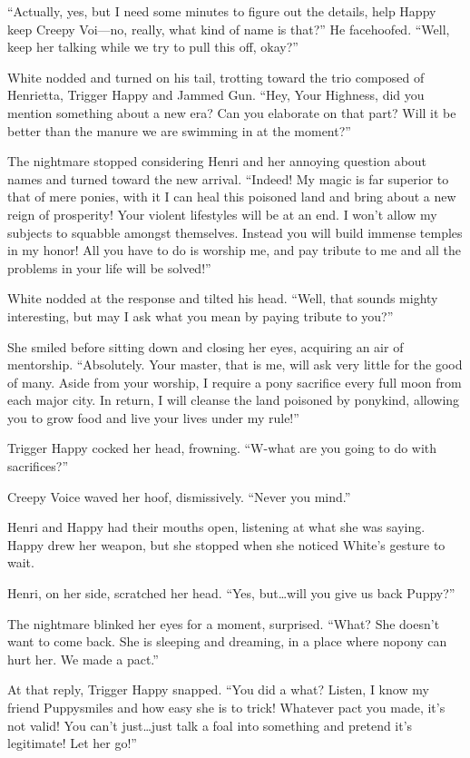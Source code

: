 ``Actually, yes, but I need some minutes to figure out the details, help Happy keep Creepy Voi---no, really, what kind of name is that?'' He facehoofed. ``Well, keep her talking while we try to pull this off, okay?''

White nodded and turned on his tail, trotting toward the trio composed of Henrietta, Trigger Happy and Jammed Gun. ``Hey, Your Highness, did you mention something about a new era? Can you elaborate on that part? Will it be better than the manure we are swimming in at the moment?''

The nightmare stopped considering Henri and her annoying question about names and turned toward the new arrival. ``Indeed! My magic is far superior to that of mere ponies, with it I can heal this poisoned land and bring about a new reign of prosperity! Your violent lifestyles will be at an end. I won't allow my subjects to squabble amongst themselves. Instead you will build immense temples in my honor! All you have to do is worship me, and pay tribute to me and all the problems in your life will be solved!''

White nodded at the response and tilted his head. ``Well, that sounds mighty interesting, but may I ask what you mean by paying tribute to you?''

She smiled before sitting down and closing her eyes, acquiring an air of mentorship. ``Absolutely. Your master, that is me, will ask very little for the good of many. Aside from your worship, I require a pony sacrifice every full moon from each major city. In return, I will cleanse the land poisoned by ponykind, allowing you to grow food and live your lives under my rule!''

Trigger Happy cocked her head, frowning. ``W-what are you going to do with sacrifices?''

Creepy Voice waved her hoof, dismissively. ``Never you mind.''

Henri and Happy had their mouths open, listening at what she was saying. Happy drew her weapon, but she stopped when she noticed White's gesture to wait.

Henri, on her side, scratched her head. ``Yes, but\dots will you give us back Puppy?''

The nightmare blinked her eyes for a moment, surprised. ``What? She doesn't want to come back. She is sleeping and dreaming, in a place where nopony can hurt her. We made a pact.''

At that reply, Trigger Happy snapped. ``You did a what? Listen, I know my friend Puppysmiles and how easy she is to trick! Whatever pact you made, it's not valid! You can't just\dots just talk a foal into something and pretend it's legitimate! Let her go!''

